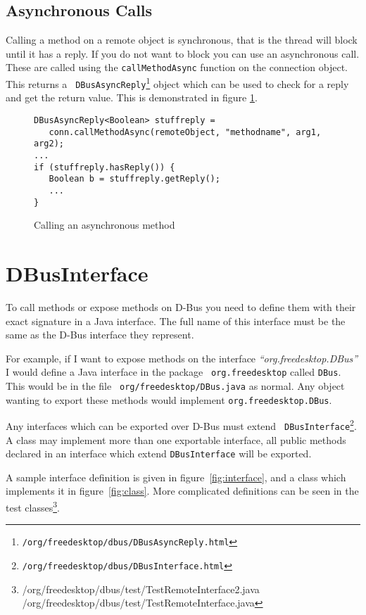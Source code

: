 \documentclass[a4paper,12pt]{article}
\begin{document}
\subsection{Asynchronous Calls}

Calling a method on a remote object is synchronous, that is the thread will
block until it has a reply. If you do not want to block you can use an
asynchronous call. These are called using the {\tt callMethodAsync} function on
the connection object. This returns a {\tt
DBusAsyncReply\footnote{\javadocroot/org/freedesktop/dbus/DBusAsyncReply.html}}
object which can be used to check for a reply and get the return value. This is demonstrated in figure \ref{fig:async}.

\begin{figure}[htb]
\begin{center}
\begin{verbatim}
DBusAsyncReply<Boolean> stuffreply = 
   conn.callMethodAsync(remoteObject, "methodname", arg1, arg2);
...
if (stuffreply.hasReply()) {
   Boolean b = stuffreply.getReply();
   ...
}
\end{verbatim}
\end{center}
\caption{Calling an asynchronous method}
\label{fig:async}
\end{figure}


\section{DBusInterface}

To call methods or expose methods on D-Bus you need to define them with their
exact signature in a Java interface. The full name of this interface must be
the same as the D-Bus interface they represent.

For example, if I want to expose methods on the interface {\em
``org.freedesktop.DBus''} I would define a Java interface in the package {\tt
org.freedesktop} called {\tt DBus}. This would be in the file {\tt
org/freedesktop/DBus.java} as normal. Any object wanting to export these
methods would implement {\tt org.freedesktop.DBus}.

Any interfaces which can be exported over D-Bus must extend {\tt
DBusInterface\footnote{\javadocroot/org/freedesktop/dbus/DBusInterface.html}}.
A class may implement more than one exportable interface, all public methods
declared in an interface which extend {\tt DBusInterface} will be exported.

A sample interface definition is given in figure~\ref{fig:interface}, and a
class which implements it in figure~\ref{fig:class}. More complicated
definitions can be seen in the test
classes\footnote{\javadocroot/org/freedesktop/dbus/test/TestRemoteInterface2.java
\javadocroot/org/freedesktop/dbus/test/TestRemoteInterface.java}.
\end{document}
